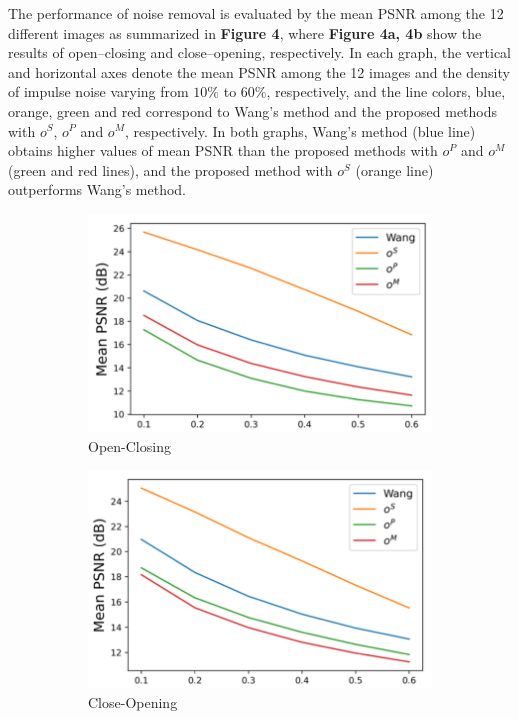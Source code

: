 The performance of noise removal is evaluated by the mean PSNR among the 12 different images as summarized in \textbf{Figure 4}, where \textbf{Figure 4a, 4b} show the results of open–closing and close–opening, respectively. In each graph, the vertical and horizontal axes denote the mean PSNR among the 12 images and the density of impulse noise varying from $10\%$ to $60\%$, respectively, and the line colors, blue, orange, green and red correspond to Wang’s method and the proposed methods with $o^S$, $o^P$ and $o^M$, respectively. In both graphs, Wang’s method (blue line) obtains higher values of mean PSNR than the proposed methods with $o^P$ and $o^M$ (green and red lines), and the proposed method with $o^S$ (orange line) outperforms Wang’s method.

\begin{figure}[H]
    \centering
    \begin{subfigure}[t]{.4\textwidth}
    \includegraphics[width=0.9\linewidth]{images/result/open-closing.png}
    \centering
    \caption{Open-Closing}
    \end{subfigure}
    \begin{subfigure}[t]{.4\textwidth}
    \includegraphics[width=0.9\linewidth]{images/result/close-opening.png}
    \centering
    \caption{Close-Opening}
    \end{subfigure}
    \caption{}
\end{figure}


